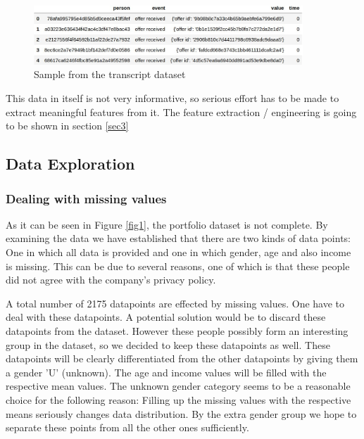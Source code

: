 \begin{figure}[h]
	\centering
	\includegraphics[width=0.9\textwidth]{fig/transcript_head.jpg}
	\vspace*{-0.1in}
	\caption{Sample from the transcript dataset}
	\label{fig3}
	\vspace*{-0.2in}
	\bigskip
\end{figure}

This data in itself is not very informative, so serious effort has to be made to extract meaningful features from it. The feature extraction / engineering is going to be shown in section \ref{sec3}

\subsection{Data Exploration}\label{sec2.2} 

\subsubsection{Dealing with missing values}
As it can be seen in Figure \ref{fig1}, the portfolio dataset is not complete. By examining the data we have established that there are two kinds of data points: One in which all data is provided and one in which gender, age and also income is missing. This can be due to several reasons, one of which is that these people did not agree with the company's privacy policy.

A total number of 2175 datapoints are effected by missing values. One have to deal with these datapoints. A potential solution would be to discard these datapoints from the dataset. However these people possibly form an interesting group in the dataset, so we decided to keep these datapoints as well. These datapoints will be clearly differentiated from the other datapoints by giving them a gender 'U' (unknown). The age and income values will be filled with the respective mean values. The unknown gender category seems to be a reasonable choice for the following reason: Filling up the missing values with the respective means seriously changes data distribution. By the extra gender group we hope to separate these points from all the other ones sufficiently.

